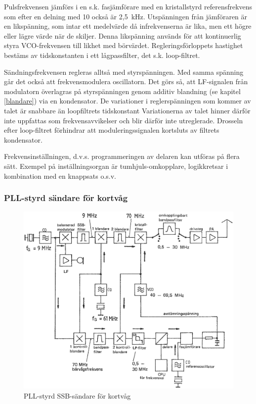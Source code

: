 Pulsfrekvensen jämförs i en s.k. fasjämförare med en kristallstyrd
referensfrekvens som efter en delning med 10 också är 2,5~kHz.
Utspänningen från jämföraren är en likspänning, som intar ett
medelvärde då infrekvenserna är lika, men ett högre eller lägre värde
när de skiljer.
Denna likspänning används för att kontinuerlig styra VCO-frekvensen
till likhet med börvärdet.
Regleringsförloppets hastighet bestäms av tidskonstanten i ett
lågpassfilter, det s.k. loop-filtret.

Sändningsfrekvensen regleras alltså med styrspänningen.
Med samma spänning går det också att frekvensmodulera oscillatorn.
Det görs så, att LF-signalen från modulatorn överlagras på styrspänningen genom
additiv blandning (se kapitel \ref{blandare}) via en kondensator.
De variationer i reglerspänningen som kommer av talet är snabbare än
loopfiltrets tidskonstant Variationerna av talet hinner därför inte
uppfattas som frekvensavvikelser och blir därför inte utreglerade.
Drosseln efter loop-filtret förhindrar att moduleringssignalen
kortsluts av filtrets kondensator.

Frekvensinställningen, d.v.s. programmeringen av delaren kan utföras
på flera sätt. Exempel på inställningsorgan är tumhjuls-omkopplare,
logikkretsar i kombination med en knappsats o.s.v.

\subsubsection{PLL-styrd sändare för kortvåg}

\begin{figure}
  \includegraphics[width=\textwidth]{images/cropped_pdfs/bild_2_5-08.pdf}
  \caption{PLL-styrd SSB-sändare för kortvåg}
  \label{fig:bildII5-8}
\end{figure}

